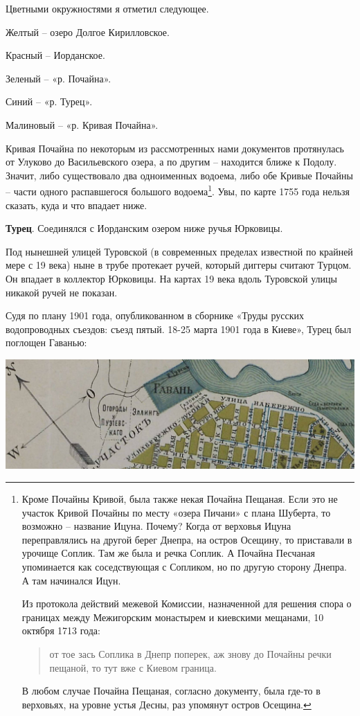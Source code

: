 Цветными окружностями я отметил следующее.

Желтый – озеро Долгое Кирилловское. 

Красный – Иорданское. 

Зеленый – «р. Почайна». 

Синий – «р. Турец». 

Малиновый – «р. Кривая Почайна».

Кривая Почайна по некоторым из рассмотренных нами документов протянулась от Улуково до Васильевского озера, а по другим – находится ближе к Подолу. Значит, либо существовало два одноименных водоема, либо обе Кривые Почайны – части одного распавшегося большого водоема\footnote{Кроме Почайны Кривой, была также некая Почайна Пещаная. Если это не участок Кривой Почайны по месту «озера Пичани» с плана Шуберта, то возможно – название Ицуна. Почему? Когда от верховья Ицуна переправлялись на другой берег Днепра, на остров Осещину, то приставали в урочище Соплик. Там же была и речка Соплик. А Почайна Песчаная упоминается как соседствующая с Сопликом, но по другую сторону Днепра. А там начинался Ицун.

Из протокола действий межевой Комиссии, назначенной для решения спора о границах между Межигорским монастырем и киевскими мещанами, 10 октября 1713 года:

\begin{quotation}
от тое зась Соплика в Днепр поперек, аж знову до Почайны речки пещаной, то тут вже с Киевом граница.
\end{quotation}

В любом случае Почайна Пещаная, согласно документу, была где-то в верховьях, на уровне устья Десны, раз упомянут остров Осещина.}. Увы, по карте 1755 года нельзя сказать, куда и что впадает ниже.

\textbf{Турец}. Соединялся с Иорданским озером ниже ручья Юрковицы. 

Под нынешней улицей Туровской (в современных пределах известной по крайней мере с 19 века) ныне в трубе протекает ручей, который диггеры считают Турцом. Он впадает в коллектор Юрковицы. На картах 19 века вдоль Туровской улицы никакой ручей не показан.

Судя по плану 1901 года, опубликованном в сборнике «Труды русских водопроводных съездов: съезд пятый. 18-25 марта 1901 года в Киеве», Турец был поглощен Гаванью: 

\begin{center}
\includegraphics[width=\linewidth]{chast-colebanie-osnov/pochayna/1901-turec.jpg}
\end{center}

